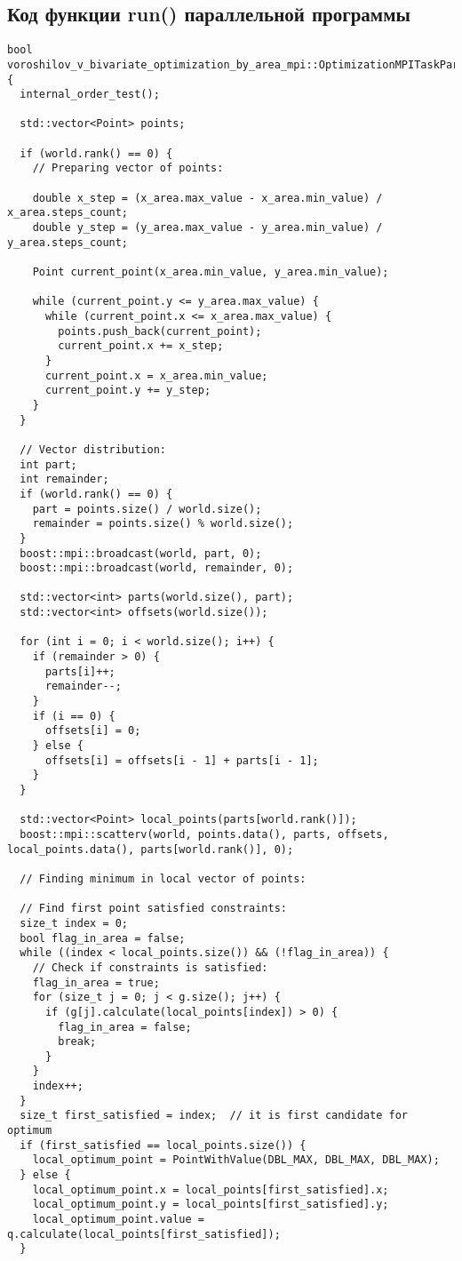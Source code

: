 \documentclass[12pt]{article}
\begin{document}
\subsection{Код функции run() параллельной программы}
\begin{verbatim}
bool voroshilov_v_bivariate_optimization_by_area_mpi::OptimizationMPITaskParallel::run() {
  internal_order_test();

  std::vector<Point> points;

  if (world.rank() == 0) {
    // Preparing vector of points:

    double x_step = (x_area.max_value - x_area.min_value) / x_area.steps_count;
    double y_step = (y_area.max_value - y_area.min_value) / y_area.steps_count;

    Point current_point(x_area.min_value, y_area.min_value);

    while (current_point.y <= y_area.max_value) {
      while (current_point.x <= x_area.max_value) {
        points.push_back(current_point);
        current_point.x += x_step;
      }
      current_point.x = x_area.min_value;
      current_point.y += y_step;
    }
  }

  // Vector distribution:
  int part;
  int remainder;
  if (world.rank() == 0) {
    part = points.size() / world.size();
    remainder = points.size() % world.size();
  }
  boost::mpi::broadcast(world, part, 0);
  boost::mpi::broadcast(world, remainder, 0);

  std::vector<int> parts(world.size(), part);
  std::vector<int> offsets(world.size());

  for (int i = 0; i < world.size(); i++) {
    if (remainder > 0) {
      parts[i]++;
      remainder--;
    }
    if (i == 0) {
      offsets[i] = 0;
    } else {
      offsets[i] = offsets[i - 1] + parts[i - 1];
    }
  }

  std::vector<Point> local_points(parts[world.rank()]);
  boost::mpi::scatterv(world, points.data(), parts, offsets, local_points.data(), parts[world.rank()], 0);

  // Finding minimum in local vector of points:

  // Find first point satisfied constraints:
  size_t index = 0;
  bool flag_in_area = false;
  while ((index < local_points.size()) && (!flag_in_area)) {
    // Check if constraints is satisfied:
    flag_in_area = true;
    for (size_t j = 0; j < g.size(); j++) {
      if (g[j].calculate(local_points[index]) > 0) {
        flag_in_area = false;
        break;
      }
    }
    index++;
  }
  size_t first_satisfied = index;  // it is first candidate for optimum
  if (first_satisfied == local_points.size()) {
    local_optimum_point = PointWithValue(DBL_MAX, DBL_MAX, DBL_MAX);
  } else {
    local_optimum_point.x = local_points[first_satisfied].x;
    local_optimum_point.y = local_points[first_satisfied].y;
    local_optimum_point.value = q.calculate(local_points[first_satisfied]);
  }


\end{verbatim}
\end{document}
